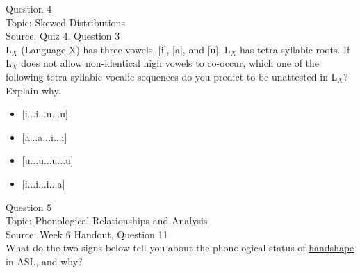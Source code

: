 \documentclass[12pt]{article}
\begin{document}
{\large Question 4}\\

Topic: Skewed Distributions\\
Source: Quiz 4, Question 3\\

L$_X$ (Language X) has three vowels, [i], [a], and [u]. L$_X$ has tetra-syllabic roots. If L$_X$ does not allow non-identical high vowels to co-occur, which one of the following tetra-syllabic vocalic sequences do you predict to be unattested in L$_X$? Explain why.\\

\begin{itemize} \item {[i...i...u...u]} \item {[a...a...i...i]} \item {[u...u...u...u]} \item {[i...i...i...a]} \end{itemize}


\newpage

{\large Question 5}\\

Topic: Phonological Relationships and Analysis\\
Source: Week 6 Handout, Question 11\\

What do the two signs below tell you about the phonological status of \underline{handshape} in ASL, and why?\\
\end{document}
